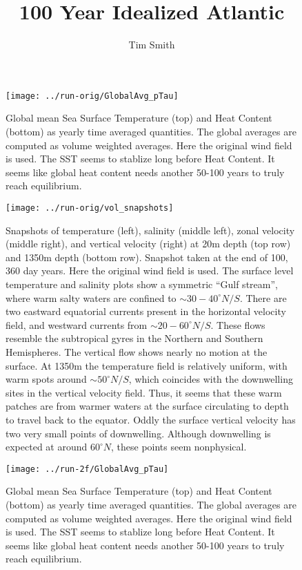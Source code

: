 \documentclass[a4paper,11pt]{article}
\title{\vspace{-10ex}100 Year Idealized Atlantic}
\author{Tim Smith}
\date{\vspace{-3ex}}
\begin{document}
 



\begin{figure}
\centering
\texttt{[image: ../run-orig/GlobalAvg\_pTau]}
\caption{Global mean Sea Surface Temperature (top) and Heat Content (bottom) as yearly time averaged quantities. The global averages are computed as volume weighted averages. Here the original wind field is used. The SST seems to stablize long before Heat Content. It seems like global heat content needs another 50-100 years to truly reach equilibrium. }
\label{fig:globalAvgs}
\end{figure}

\begin{figure}
\centering
\texttt{[image: ../run-orig/vol\_snapshots]}
\caption{Snapshots of temperature (left), salinity (middle left), zonal velocity (middle right), and vertical velocity (right) at 20m depth (top row) and 1350m depth (bottom row). Snapshot taken at the end of 100, 360 day years. Here the original wind field is used. The surface level temperature and salinity plots show a symmetric ``Gulf stream'', where warm salty waters are confined to $\sim 30-40^{\circ}N/S$. There are two eastward equatorial currents present in the horizontal velocity field, and westward currents from $\sim20-60^{\circ}N/S$. These flows resemble the subtropical gyres in the Northern and Southern Hemispheres. The vertical flow shows nearly no motion at the surface. At 1350m the temperature field is relatively uniform, with warm spots around $\sim50^{\circ}N/S$, which coincides with the downwelling sites in the vertical velocity field. Thus, it seems that these warm patches are from warmer waters at the surface circulating to depth to travel back to the equator. Oddly the surface vertical velocity has two very small points of downwelling. Although downwelling is expected at around $60^{\circ}N$, these points seem nonphysical.}
\label{fig:volSnaps}
\end{figure}


\begin{figure}
\centering
\texttt{[image: ../run-2f/GlobalAvg\_pTau]}
\caption{Global mean Sea Surface Temperature (top) and Heat Content (bottom) as yearly time averaged quantities. The global averages are computed as volume weighted averages. Here the original wind field is used. The SST seems to stablize long before Heat Content. It seems like global heat content needs another 50-100 years to truly reach equilibrium. }
\label{fig:2f_globalAvgs}
\end{figure}
\end{document}
